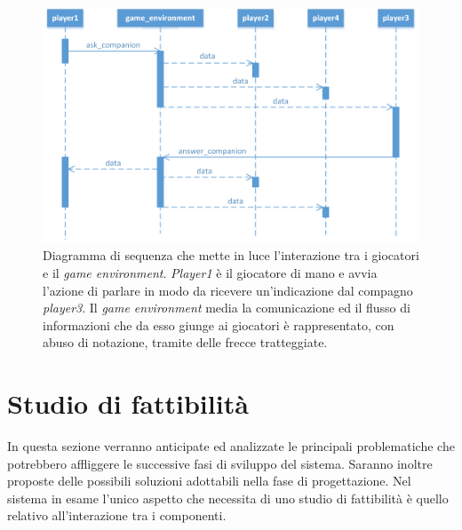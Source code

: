 \documentclass[a4paper,12pt]{article}
\begin{document}
\begin{figure}[H]
	\hspace*{-0.85in}
	\centering
	\includegraphics[width=180mm]{./img/speak_sequence_diagram.png}
	\caption{Diagramma di sequenza che mette in luce l'interazione tra i giocatori e il \emph{game environment}. \emph{Player1} è il giocatore di mano e avvia l'azione di parlare in modo da ricevere un'indicazione dal compagno \emph{player3}. Il \emph{game environment} media la comunicazione ed il flusso di informazioni che da esso giunge ai giocatori è rappresentato, con abuso di notazione, tramite delle frecce tratteggiate. \label{speak-sequence-diagram}}
\end{figure}


\section{Studio di fattibilità} \label{feasibility-study}
In questa sezione verranno anticipate ed analizzate le principali problematiche che potrebbero affliggere le successive fasi di sviluppo del sistema. Saranno inoltre proposte delle possibili soluzioni adottabili nella fase di progettazione. Nel sistema in esame l'unico aspetto che necessita di uno studio di fattibilità è quello relativo all'interazione tra i componenti.
\end{document}

